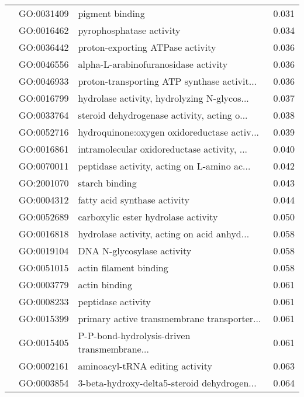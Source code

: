 \begin{longtable}{lllr}
   & GO:0031409 &                              pigment binding &         0.031 \\
   & GO:0016462 &                     pyrophosphatase activity &         0.034 \\
   & GO:0036442 &             proton-exporting ATPase activity &         0.036 \\
   & GO:0046556 &         alpha-L-arabinofuranosidase activity &         0.036 \\
   & GO:0046933 &  proton-transporting ATP synthase activit... &         0.036 \\
   & GO:0016799 &  hydrolase activity, hydrolyzing N-glycos... &         0.037 \\
   & GO:0033764 &  steroid dehydrogenase activity, acting o... &         0.038 \\
   & GO:0052716 &  hydroquinone:oxygen oxidoreductase activ... &         0.039 \\
   & GO:0016861 &  intramolecular oxidoreductase activity, ... &         0.040 \\
   & GO:0070011 &  peptidase activity, acting on L-amino ac... &         0.042 \\
   & GO:2001070 &                               starch binding &         0.043 \\
   & GO:0004312 &                 fatty acid synthase activity &         0.044 \\
   & GO:0052689 &          carboxylic ester hydrolase activity &         0.050 \\
   & GO:0016818 &  hydrolase activity, acting on acid anhyd... &         0.058 \\
   & GO:0019104 &                   DNA N-glycosylase activity &         0.058 \\
   & GO:0051015 &                       actin filament binding &         0.058 \\
   & GO:0003779 &                                actin binding &         0.061 \\
   & GO:0008233 &                           peptidase activity &         0.061 \\
   & GO:0015399 &  primary active transmembrane transporter... &         0.061 \\
   & GO:0015405 &  P-P-bond-hydrolysis-driven transmembrane... &         0.061 \\
   & GO:0002161 &              aminoacyl-tRNA editing activity &         0.063 \\
   & GO:0003854 &  3-beta-hydroxy-delta5-steroid dehydrogen... &         0.064 \\

\end{longtable}
